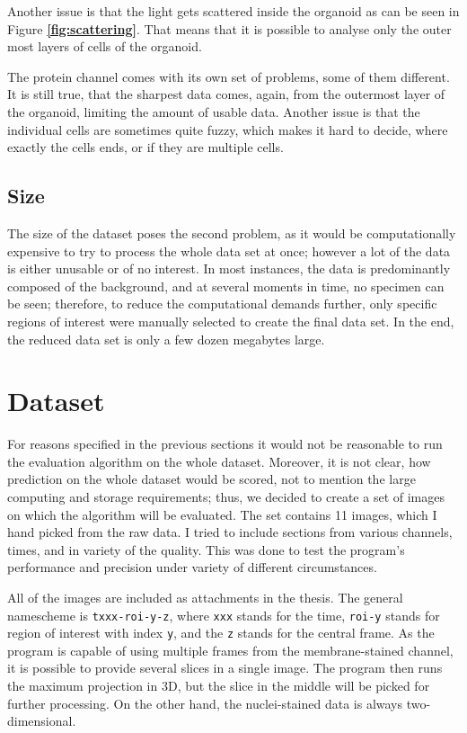 \documentclass[
  digital,     %
  oneside,     %
  nosansbold,  %
  nocolorbold, %
  lof,         %
  lot,         %
]{fithesis4}
\begin{document}
Another issue is that the light gets scattered inside the organoid as can be seen
in Figure \textbf{\ref{fig:scattering}}. That means that it is possible to analyse only the
outer most layers of cells of the organoid.

The protein channel comes with its own set of problems, some of them different.
It is still true, that the sharpest data comes, again, from the outermost layer
of the organoid, limiting the amount of usable data. Another issue is that the
individual cells are sometimes quite fuzzy, which makes it hard to decide, where
exactly the cells ends, or if they are multiple cells.

\subsection{Size}

The size of the dataset poses the second problem, as it would be computationally
expensive to try to process the whole data set at once; however a lot of the
data is either unusable or of no interest. In most instances, the data is
predominantly composed of the background, and at several moments in time, no
specimen can be seen; therefore, to reduce the computational demands further,
only specific regions of interest were manually selected to create the final
data set. In the end, the reduced data set is only a few dozen megabytes large.

\section{Dataset}

For reasons specified in the previous sections it would not be reasonable
to run the evaluation algorithm on the whole dataset. Moreover, it is not clear,
how prediction on the whole dataset would be scored, not to mention the large
computing and storage requirements; thus, we decided to create a set of images
on which the algorithm will be evaluated. The set contains 11 images, which I
hand picked from the raw data. I tried to include sections from various
channels, times, and in variety of the quality. This was done to test the
program's performance and precision under variety of different circumstances.


All of the images are included as attachments in the thesis. The general
namescheme is \texttt{txxx-roi-y-z}, where \texttt{xxx} stands for the time,
\texttt{roi-y} stands for region of interest with index \texttt{y}, and the
\texttt{z} stands for the central frame. As the program is capable of using
multiple frames from the membrane-stained channel, it is possible to provide
several slices in a single image. The program then runs the maximum projection
in 3D, but the slice in the middle will be picked for further processing. On the
other hand, the nuclei-stained data is always two-dimensional.
\end{document}
